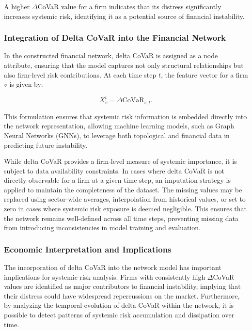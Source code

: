 \documentclass[preprint,12pt,authoryear]{elsarticle}
\begin{document}
A higher \(\Delta\)CoVaR value for a firm indicates that its distress significantly increases systemic risk, identifying it as a potential source of financial instability.

\subsubsection{Integration of Delta CoVaR into the Financial Network}  

In the constructed financial network, delta CoVaR is assigned as a node attribute, ensuring that the model captures not only structural relationships but also firm-level risk contributions. At each time step \( t \), the feature vector for a firm \( v \) is given by:

\[
X_v^t = \Delta \text{CoVaR}_{v,t}.
\]

This formulation ensures that systemic risk information is embedded directly into the network representation, allowing machine learning models, such as Graph Neural Networks (GNNs), to leverage both topological and financial data in predicting future instability.

While delta CoVaR provides a firm-level measure of systemic importance, it is subject to data availability constraints. In cases where delta CoVaR is not directly observable for a firm at a given time step, an imputation strategy is applied to maintain the completeness of the dataset. The missing values may be replaced using sector-wide averages, interpolation from historical values, or set to zero in cases where systemic risk exposure is deemed negligible. This ensures that the network remains well-defined across all time steps, preventing missing data from introducing inconsistencies in model training and evaluation.

\subsubsection{Economic Interpretation and Implications}  

The incorporation of delta CoVaR into the network model has important implications for systemic risk analysis. Firms with consistently high \(\Delta\)CoVaR values are identified as major contributors to financial instability, implying that their distress could have widespread repercussions on the market. Furthermore, by analyzing the temporal evolution of delta CoVaR within the network, it is possible to detect patterns of systemic risk accumulation and dissipation over time.
\end{document}
